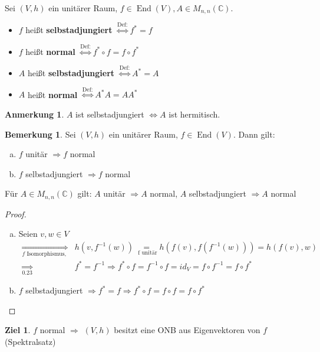 \documentclass[a4paper, titlepage]{article}
\theoremstyle{definition}
\newtheorem{bem}[satz]{Bemerkung}
\newtheorem*{anm}{Anmerkung}
\newtheorem*{ziel}{Ziel}
\newcommand{\C}{\mathbb{C}}
\begin{document}
\newpage
\begin{definition}
	Sei $(V,h)$ ein unitärer Raum, $f\in \operatorname{End}(V), A\in M_{n,n}(\C).$ 
	\begin{itemize}
		\item $f$ heißt \textbf{selbstadjungiert} $\overset{\text{Def:}}{\Leftrightarrow}f^{*} = f$
		\item $f$ heißt \textbf{normal} $\overset{\text{Def:}}{\Leftrightarrow} f^{*}\circ f = f \circ f^{*}$
		\item $A$ heißt \textbf{selbstadjungiert} $\overset{\text{Def:}}{\Leftrightarrow} A^{*}=A$
		\item $A$ heißt \textbf{normal} $\overset{\text{Def:}}{\Leftrightarrow} A^{*}A=AA^{*}$
	\end{itemize}
\begin{anm}
    $A$ ist selbstadjungiert $\Leftrightarrow A $ ist hermitisch.
\end{anm}
\end{definition}
\begin{bem}
	Sei $(V,h)$ ein unitärer Raum, $f \in \operatorname{End}(V)$.
	Dann gilt: \begin{enumerate}[(a)]
		\item $f$ unitär $\Rightarrow f $ normal
		\item $f$ selbstadjungiert $\Rightarrow f $ normal
	\end{enumerate}
Für $A\in M_{n,n}(\C)$ gilt: $A$ unitär $\Rightarrow A$ normal, $A$ selbstadjungiert $\Rightarrow A$ normal
\end{bem}
\begin{proof}
	\begin{enumerate}[(a)]
		\item Seien $v,w \in V$ 
		\begin{align*}
		\underset{f \text{ Isomorphismus, da unitär }}{\Rightarrow} &h(v,f^{-1}(w)) \underset{\text{ f unitär}}{=}h(f(v),f(f^{-1}(w)))=h(f(v),w)\\
		\underset{0.23}{\Rightarrow} &f^{*} = f^{-1} \Rightarrow f^{*}\circ f = f^{-1} \circ f = id_V = f \circ f^{-1} = f \circ f^{*}
		\end{align*}
		\item $f$ selbstadjungiert $\Rightarrow f^{*} = f \Rightarrow f^{*} \circ f = f \circ f = f \circ  f^{*}$
	\end{enumerate}
\end{proof}
\begin{ziel}
 $f$ normal $\Rightarrow$ $(V,h) $ besitzt eine ONB aus Eigenvektoren von $f$ (Spektralsatz)
\end{ziel}
\end{document}

